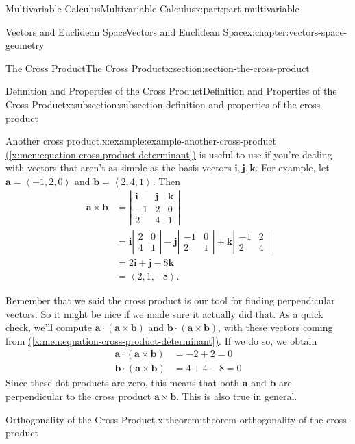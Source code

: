 \documentclass[twoside,10pt,]{book}
\newcommand{\xreffont}{\relax}
\numberwithin{equation}{part}
\newcommand{\dotprod}[1]{\left\langle #1 \right\rangle}
\begin{document}
\begin{partptx}{Multivariable Calculus}{}{Multivariable Calculus}{}{}{x:part:part-multivariable}
\begin{chapterptx}{Vectors and Euclidean Space}{}{Vectors and Euclidean Space}{}{}{x:chapter:vectors-space-geometry}
\begin{sectionptx}{The Cross Product}{}{The Cross Product}{}{}{x:section:section-the-cross-product}
\begin{subsectionptx}{Definition and Properties of the Cross Product}{}{Definition and Properties of the Cross Product}{}{}{x:subsection:subsection-definition-and-properties-of-the-cross-product}
\begin{example}{Another cross product.}{x:example:example-another-cross-product}
\hyperref[x:men:equation-cross-product-determinant]{({\xreffont\ref{x:men:equation-cross-product-determinant}})} is useful to use if you're dealing with vectors that aren't as simple as the basis vectors \(\mathbf{i},\mathbf{j},\mathbf{k}\). For example, let \(\mathbf{a} = \dotprod{-1,2,0}\) and \(\mathbf{b} = \dotprod{2,4,1}\). Then%
%
\begin{align*}
\mathbf{a}\times\mathbf{b} & = \left|\begin{array}{ccc}
\mathbf{i} & \mathbf{j} & \mathbf{k} \\
-1 & 2 & 0 \\
2 & 4 & 1 \end{array}\right| \\
& = \mathbf{i}\left|\begin{array}{cc} 2 & 0 \\ 4 & 1\end{array}\right| - \mathbf{j}\left|\begin{array}{cc} -1 & 0 \\ 2 & 1\end{array}\right| + \mathbf{k}\left|\begin{array}{cc} -1 & 2 \\ 2 & 4\end{array}\right|\\
& = 2\mathbf{i}+\mathbf{j}-8\mathbf{k}\\
& = \dotprod{2,1,-8}. 
\end{align*}
\end{example}
Remember that we said the cross product is our tool for finding perpendicular vectors. So it might be nice if we made sure it actually did that. As a quick check, we'll compute \(\mathbf{a}\cdot(\mathbf{a}\times\mathbf{b})\) and \(\mathbf{b}\cdot(\mathbf{a}\times\mathbf{b})\), with these vectors coming from \hyperref[x:men:equation-cross-product-determinant]{({\xreffont\ref{x:men:equation-cross-product-determinant}})}. If we do so, we obtain%
%
\begin{align*}
\mathbf{a}\cdot(\mathbf{a}\times\mathbf{b}) & = -2 + 2 = 0 \\
\mathbf{b}\cdot(\mathbf{a}\times\mathbf{b}) & = 4 + 4 - 8 = 0 
\end{align*}
Since these dot products are zero, this means that both \(\mathbf{a}\) and \(\mathbf{b}\) are perpendicular to the cross product \(\mathbf{a}\times\mathbf{b}\). This is also true in general.%
\begin{theorem}{Orthogonality of the Cross Product.}{}{x:theorem:theorem-orthogonality-of-the-cross-product}%

\end{theorem}
\end{subsectionptx}
\end{sectionptx}
\end{chapterptx}
\end{partptx}
\end{document}
